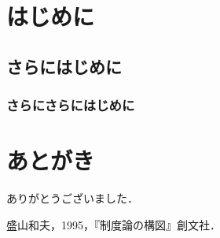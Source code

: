 \documentclass[a4paper,11pt,oneside,openany,uplatex]{jsbook}
\begin{document}
%
\frontmatter

\tableofcontents

\mainmatter

\chapter{はじめに}
\section{さらにはじめに}
\subsection{さらにさらにはじめに}

 \backmatter
\chapter{あとがき}
ありがとうございました．

\begin{thebibliography}{99}
\bibitem{}
盛山和夫，1995，『制度論の構図』創文社．
\end{thebibliography}
\end{document}
